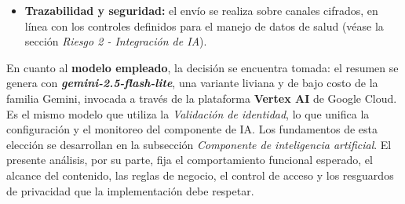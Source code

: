 \documentclass[a4paper,12pt]{article}
\begin{document}
\begin{itemize}
        \item \textbf{Trazabilidad y seguridad:} el envío se realiza sobre canales cifrados, en línea con los controles definidos para el manejo de datos de salud (véase la sección \textit{Riesgo 2 - Integración de IA}).
    \end{itemize}
    \par En cuanto al \textbf{modelo empleado}, la decisión se encuentra tomada: el resumen se genera con \textbf{\textit{gemini-2.5-flash-lite}}, una variante liviana y de bajo costo de la familia Gemini, invocada a través de la plataforma \textbf{Vertex AI} de Google Cloud. Es el mismo modelo que utiliza la \textit{Validación de identidad}, lo que unifica la configuración y el monitoreo del componente de IA. Los fundamentos de esta elección se desarrollan en la subsección \textit{Componente de inteligencia artificial}. El presente análisis, por su parte, fija el comportamiento funcional esperado, el alcance del contenido, las reglas de negocio, el control de acceso y los resguardos de privacidad que la implementación debe respetar.
\end{document}
